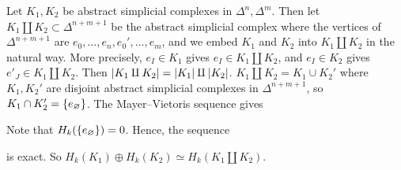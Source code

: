 \begin{example}
	Let \( K_1, K_2 \) be abstract simplicial complexes in \( \Delta^n, \Delta^m \).
	Then let \( K_1 \amalg K_2 \subset \Delta^{n+m+1} \) be the abstract simplicial complex where the vertices of \( \Delta^{n+m+1} \) are \( e_0, \dots, e_n, e_0', \dots, e_m \), and we embed \( K_1 \) and \( K_2 \) into \( K_1 \amalg K_2 \) in the natural way.
	More precisely, \( e_I \in K_1 \) gives \( e_I \in K_1 \amalg K_2 \), and \( e_I \in K_2 \) gives \( e'_J \in K_1 \amalg K_2 \).
	Then \( \abs{K_1 \amalg K_2} = \abs{K_1} \amalg \abs{K_2} \).
	\( K_1 \amalg K_2 = K_1 \cup K_2' \) where \( K_1, K_2' \) are disjoint abstract simplicial complexes in \( \Delta^{n+m+1} \), so \( K_1 \cap K_2' = \qty{e_\varnothing} \).
	The Mayer--Vietoris sequence gives
	\begin{center}
	\end{center}
	Note that \( H_k(\qty{e_\varnothing}) = 0 \).
	Hence, the sequence
	\begin{center}
	\end{center}
	is exact.
	So \( H_k(K_1) \oplus H_k(K_2) \simeq H_k(K_1 \amalg K_2) \).
\end{example}

